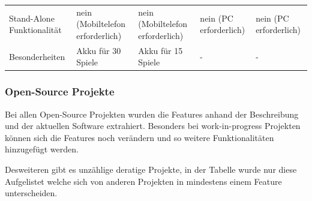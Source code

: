 \begin{longtable}[]{@{}lllll@{}}
\begin{minipage}[t]{0.18\columnwidth}\raggedright
Stand-Alone Funktionalität\strut
\end{minipage} & \begin{minipage}[t]{0.18\columnwidth}\raggedright
nein (Mobiltelefon erforderlich)\strut
\end{minipage} & \begin{minipage}[t]{0.22\columnwidth}\raggedright
nein (Mobiltelefon erforderlich)\strut
\end{minipage} & \begin{minipage}[t]{0.15\columnwidth}\raggedright
nein (PC erforderlich)\strut
\end{minipage} & \begin{minipage}[t]{0.13\columnwidth}\raggedright
nein (PC erforderlich)\strut
\end{minipage}\tabularnewline
\begin{minipage}[t]{0.18\columnwidth}\raggedright
Besonderheiten\strut
\end{minipage} & \begin{minipage}[t]{0.18\columnwidth}\raggedright
Akku für 30 Spiele\strut
\end{minipage} & \begin{minipage}[t]{0.22\columnwidth}\raggedright
Akku für 15 Spiele\strut
\end{minipage} & \begin{minipage}[t]{0.15\columnwidth}\raggedright
-\strut
\end{minipage} & \begin{minipage}[t]{0.13\columnwidth}\raggedright
-\strut
\end{minipage}\tabularnewline
\bottomrule
\end{longtable}

\hypertarget{open-source-projekte}{%
\subsubsection{Open-Source Projekte}\label{open-source-projekte}}

Bei allen Open-Source Projekten wurden die Features anhand der
Beschreibung und der aktuellen Software extrahiert. Besonders bei
work-in-progress Projekten können sich die Features noch verändern und
so weitere Funktionalitäten hinzugefügt werden.

Desweiteren gibt es unzählige deratige Projekte, in der Tabelle wurde
nur diese Aufgelistet welche sich von anderen Projekten in mindestens
einem Feature unterscheiden.

